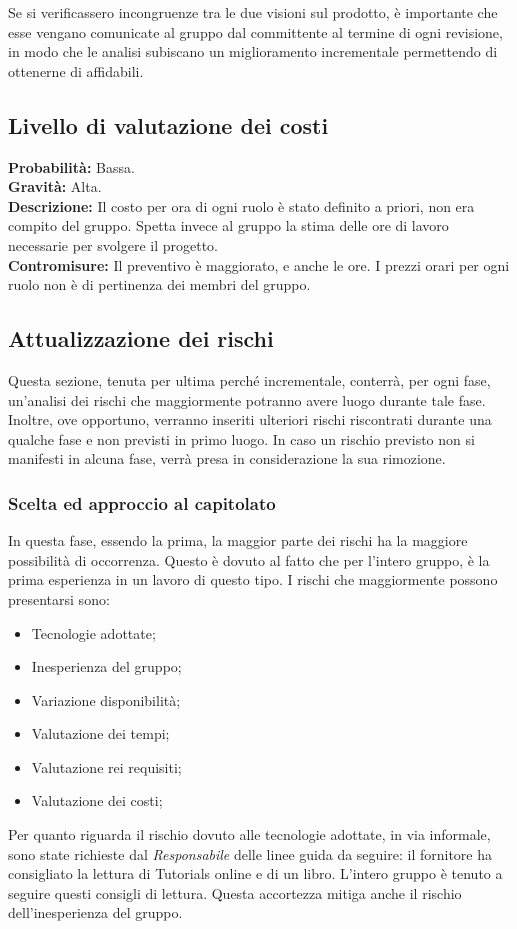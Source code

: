 \documentclass[a4paper]{article}
\begin{document}
				Se si verificassero incongruenze tra le due visioni sul prodotto, è importante che esse vengano comunicate 
				al gruppo dal committente al termine di ogni revisione, in modo che le analisi subiscano un miglioramento 
				incrementale permettendo di ottenerne di affidabili.
		\subsection{Livello di valutazione dei costi}
			\textbf{Probabilità:} Bassa. 
			\\
			\textbf{Gravità:} Alta.
			\\
			\textbf{Descrizione:} Il costo per ora di ogni ruolo è stato definito a priori, non era compito del gruppo. Spetta invece al 
				gruppo la stima delle ore di lavoro necessarie per svolgere il progetto.
			\\
			\textbf{Contromisure:} Il preventivo è maggiorato, e anche le ore. I prezzi orari per ogni ruolo non è di pertinenza dei membri 
				del gruppo.
		\subsection{Attualizzazione dei rischi}
			Questa sezione, tenuta per ultima perché incrementale, conterrà, per ogni fase, un'analisi dei rischi che maggiormente potranno
			avere luogo durante tale fase. Inoltre, ove opportuno, verranno inseriti ulteriori rischi riscontrati durante una qualche fase e 
			non previsti in primo luogo. In caso un rischio previsto non si manifesti in alcuna fase, verrà presa in considerazione la sua rimozione.
			
			\subsubsection{Scelta ed approccio al capitolato}
				In questa fase, essendo la prima, la maggior parte dei rischi ha la maggiore possibilità di occorrenza. Questo è 
				dovuto al fatto che per l'intero gruppo, è la prima esperienza in un lavoro di questo tipo. I rischi che maggiormente 
				possono presentarsi sono:
				\begin{itemize}
					\item Tecnologie adottate;
					\item Inesperienza del gruppo;
					\item Variazione disponibilità;
					\item Valutazione dei tempi;
					\item Valutazione rei requisiti;
					\item Valutazione dei costi;
				\end{itemize}
				Per quanto riguarda il rischio dovuto alle tecnologie adottate, in via informale, sono state richieste dal \emph{Responsabile}
				delle linee guida da seguire: il fornitore ha consigliato la lettura di Tutorials online e di un libro. L'intero gruppo è tenuto 
				a seguire questi consigli di lettura. Questa accortezza mitiga anche il rischio dell'inesperienza del gruppo.
				
\end{document}
